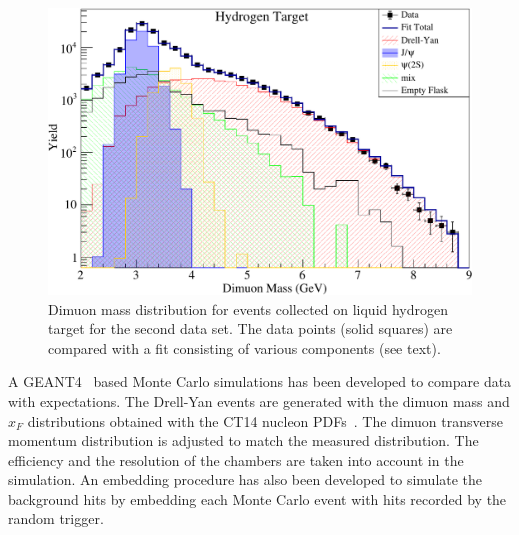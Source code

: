 \documentclass[reprint,aps,unsortedaddress,superscriptaddress,prl,floatfix,showpacs,linenumbers]{revtex4-2}
\begin{document}
\begin{figure}[htbp!]
	\centering
	\includegraphics[width=\linewidth]{massfit_run56_LH2.pdf}
	\caption{Dimuon mass distribution for events collected
		on liquid hydrogen target for the second data set.
		The data points (solid squares) are compared with a fit consisting of
		various components (see text).}
	\label{fig:massfit}
\end{figure}

A GEANT4~\cite{agostinelli2003,allison2006,allison2016} based Monte
Carlo simulations has been developed to compare data with expectations.
The Drell-Yan events are generated with the dimuon mass and $x_F$
distributions obtained with the CT14 nucleon PDFs~\cite{hou2018}.
The dimuon transverse momentum distribution is adjusted to match the measured distribution.
The efficiency and the resolution of the chambers are taken into account in the simulation.
An embedding procedure has also been developed to simulate the background hits by embedding each Monte Carlo event
with hits recorded by the random trigger.
\end{document}
